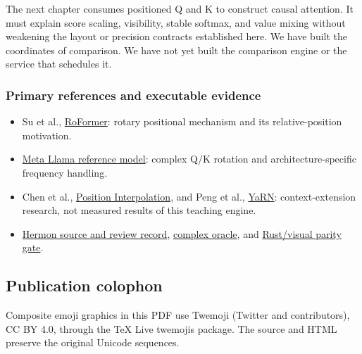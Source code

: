 \documentclass[
  10pt,
]{article}
\providecommand{\tightlist}{%
  \setlength{\itemsep}{0pt}\setlength{\parskip}{0pt}}
\begin{document}
The next chapter consumes positioned Q and K to construct causal
attention. It must explain score scaling, visibility, stable softmax,
and value mixing without weakening the layout or precision contracts
established here. We have built the coordinates of comparison. We have
not yet built the comparison engine or the service that schedules it.

\subsubsection{Primary references and executable
evidence}\label{primary-references-and-executable-evidence}

\begin{itemize}
\tightlist
\item
  Su et al., \href{https://arxiv.org/html/2104.09864v5}{RoFormer}:
  rotary positional mechanism and its relative-position motivation.
\item
  \href{https://raw.githubusercontent.com/meta-llama/llama-models/main/models/llama3/model.py}{Meta
  Llama reference model}: complex Q/K rotation and architecture-specific
  frequency handling.
\item
  Chen et al., \href{https://arxiv.org/abs/2306.15595}{Position
  Interpolation}, and Peng et al.,
  \href{https://arxiv.org/abs/2309.00071}{YaRN}: context-extension
  research, not measured results of this teaching engine.
\item
  \href{https://github.com/hermonai/inside-the-llm-engine/blob/astra-visual-rewrite/research/part-02/chapter-09-position-rope.md}{Hermon
  source and review record},
  \href{https://github.com/hermonai/inside-the-llm-engine/blob/astra-visual-rewrite/code/reference/python/chapter09_rope_oracle.py}{complex
  oracle}, and
  \href{https://github.com/hermonai/inside-the-llm-engine/blob/astra-visual-rewrite/scripts/check-rope-visual-parity.py}{Rust/visual
  parity gate}.
\end{itemize}

\subsection{Publication colophon}\label{publication-colophon}

Composite emoji graphics in this PDF use Twemoji (Twitter and
contributors), CC BY 4.0, through the TeX Live twemojis package. The
source and HTML preserve the original Unicode sequences.
\end{document}
